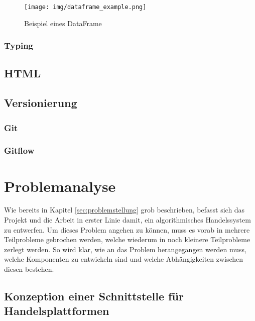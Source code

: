 \documentclass[oneside]{ausarbeitung}
\begin{document}
\begin{figure}[H]
  \centering
  \texttt{[image: img/dataframe\_example.png]}
  \caption{Beispiel eines DataFrame\cite{dataframe_example}}
  \label{fig:8}
\end{figure}
 

\subsection{Typing}
\label{sub:typing}


\section{HTML}
\label{sec:html}


\section{Versionierung}
\label{sec:versionierung}

\subsection{Git}
\label{sub:git}

\subsection{Gitflow}
\label{sub:gitflow}

\chapter{Problemanalyse}
\label{cha:problemanalyse}

Wie bereits in Kapitel \ref{sec:problemstellung} grob beschrieben,
befasst sich das Projekt und die Arbeit in erster Linie damit, ein
algorithmisches Handelssystem zu entwerfen. Um dieses Problem angehen
zu können, muss es vorab in mehrere Teilprobleme gebrochen werden,
welche wiederum in noch kleinere Teilprobleme zerlegt werden. So wird
klar, wie an das Problem herangegangen werden muss, welche Komponenten
zu entwickeln sind und welche Abhängigkeiten zwischen diesen
bestehen.


\section{Konzeption einer Schnittstelle für Handelsplattformen}
\label{sec:schnittstelle_handelsplatform}
\end{document}
